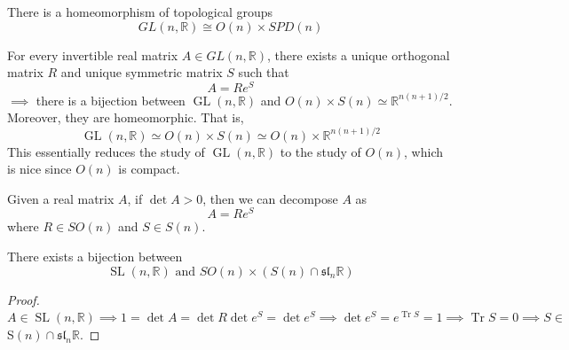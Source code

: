 \documentclass{article}
\DeclareMathOperator{\Tr}{Tr}
\DeclareMathOperator{\GL}{GL}
\DeclareMathOperator{\SL}{SL}
\begin{document}
    \begin{corollary}
      \label{thm:polar-decomposition-of-glnr}
      There is a homeomorphism of topological groups
      \begin{equation}
        GL(n, \mathbb{R}) \cong O(n) \times SPD(n)
      \end{equation}
    \end{corollary}

    \begin{corollary}
      \label{thm:uniqueness-of-the-real-polar-decomposition}
      For every invertible real matrix $A \in GL(n, \mathbb{R})$, there exists a unique orthogonal matrix $R$ and unique symmetric matrix $S$ such that
      \begin{equation}
        A = R e^S
      \end{equation}
      $\implies$ there is a bijection between $\GL(n, \mathbb{R})$ and $O(n) \times S(n) \simeq \mathbb{R}^{n(n+1)/2}$. Moreover, they are homeomorphic. That is, 
      \begin{equation}
        \GL(n, \mathbb{R}) \simeq O(n) \times S(n) \simeq O(n) \times \mathbb{R}^{n(n+1)/2}
      \end{equation}
      This essentially reduces the study of $\GL(n, \mathbb{R})$ to the study of $O(n)$, which is nice since $O(n)$ is compact. 
    \end{corollary}

    \begin{corollary}
      \label{thm:polar-decomposition-with-positive-determinant}
      Given a real matrix $A$, if $\det{A} > 0$, then we can decompose $A$ as
      \begin{equation}
        A = R e^S
      \end{equation}
      where $R \in SO(n)$ and $S \in S(n)$. 
    \end{corollary}

    \begin{corollary}
      \label{thm:polar-decomposition-of-slnr}
      There exists a bijection between
      \begin{equation}
        \SL(n, \mathbb{R}) \text{ and } SO(n) \times (S(n) \cap \mathfrak{sl}_n \mathbb{R})
      \end{equation}
    \end{corollary}
    \begin{proof}
      $A \in \SL(n, \mathbb{R}) \implies 1 = \det{A} = \det{R} \det{e^S} = \det{e^S} \implies \det{e^S} = e^{\Tr{S}} = 1 \implies \Tr{S} = 0 \implies S \in$ S$(n) \cap \mathfrak{sl}_n \mathbb{R}$. 
    \end{proof}
\end{document}

